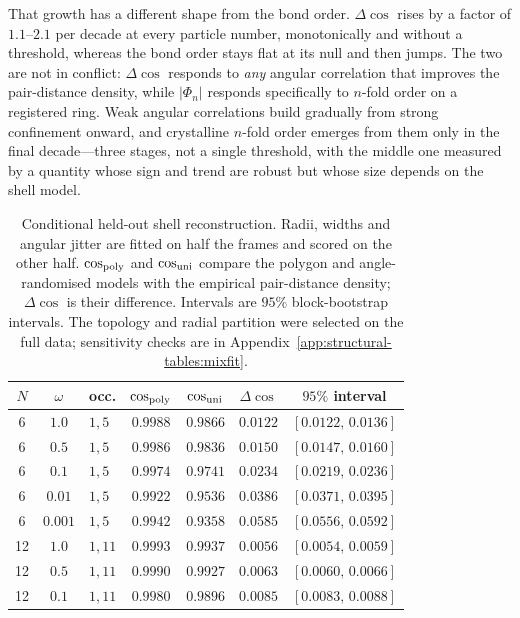 That growth has a different shape from the bond order. $\Delta\cos$ rises by a factor of
$1.1$--$2.1$ per decade at every particle number, monotonically and without a threshold,
whereas the bond order stays flat at its null and then jumps. The two are not in conflict:
$\Delta\cos$ responds to \emph{any} angular correlation that improves the pair-distance
density, while $|\Phi_n|$ responds specifically to $n$-fold order on a registered ring. Weak
angular correlations build gradually from strong confinement onward, and crystalline $n$-fold
order emerges from them only in the final decade---three stages, not a single threshold, with
the middle one measured by a quantity whose sign and trend are robust but whose size depends
on the shell model.

\begin{table}[htbp]
\centering
\caption[Held-out shell-model fit against an angle-randomised null]{Conditional held-out
shell reconstruction. Radii, widths and angular jitter are fitted on half the frames and
scored on the other half. $\cos_{\rm poly}$ and $\cos_{\rm uni}$ compare the polygon and
angle-randomised models with the empirical pair-distance density; $\Delta\cos$ is their
difference. Intervals are $95\%$ block-bootstrap intervals. The topology and radial
partition were selected on the full data; sensitivity checks are in
Appendix~\ref{app:structural-tables:mixfit}.}
\label{tab:shell-model-fit-main}
\small
\setlength{\tabcolsep}{6pt}
\begin{tabular}{ccl cccc}
\toprule
$N$ & $\omega$ & occ. & $\cos_{\rm poly}$ & $\cos_{\rm uni}$ & $\Delta\cos$ & $95\%$ interval \\
\midrule
6 & $1.0$ & $1,5$ & $0.9988$ & $0.9866$ & $\mathbf{0.0122}$ & $[0.0122,\,0.0136]$ \\
6 & $0.5$ & $1,5$ & $0.9986$ & $0.9836$ & $\mathbf{0.0150}$ & $[0.0147,\,0.0160]$ \\
6 & $0.1$ & $1,5$ & $0.9974$ & $0.9741$ & $\mathbf{0.0234}$ & $[0.0219,\,0.0236]$ \\
6 & $0.01$ & $1,5$ & $0.9922$ & $0.9536$ & $\mathbf{0.0386}$ & $[0.0371,\,0.0395]$ \\
6 & $0.001$ & $1,5$ & $0.9942$ & $0.9358$ & $\mathbf{0.0585}$ & $[0.0556,\,0.0592]$ \\
\midrule
12 & $1.0$ & $1,11$ & $0.9993$ & $0.9937$ & $\mathbf{0.0056}$ & $[0.0054,\,0.0059]$ \\
12 & $0.5$ & $1,11$ & $0.9990$ & $0.9927$ & $\mathbf{0.0063}$ & $[0.0060,\,0.0066]$ \\
12 & $0.1$ & $1,11$ & $0.9980$ & $0.9896$ & $\mathbf{0.0085}$ & $[0.0083,\,0.0088]$ \\

\end{tabular}
\end{table}
